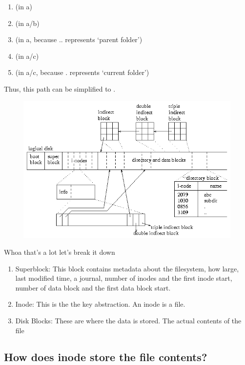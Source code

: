 \begin{enumerate}
  \item {} (in a) 
  \item {} (in a/b)
  \item {} (in a, because .. represents `parent folder')
  \item {} (in a/c)
  \item {} (in a/c, because . represents `current folder')
\end{enumerate}

Thus, this path can be simplified to .

\begin{figure}[htbp]
\centering
\includegraphics[width=.8\textwidth]{filesystems/images/disk.gif}
\caption{}
\end{figure}

Whoa that's a lot let's break it down 

\begin{enumerate}
\item Superblock: This block contains metadata about the filesystem, how large, last modified time, a journal, number of inodes and the first inode start, number of data block and the first data block start. 
\item Inode: This is the the key abstraction. An inode is a file. 
\item Disk Blocks: These are where the data is stored. The actual contents of the file
\end{enumerate}

\subsection{How does inode store the file contents?}\label{how-does-inode-store-the-file-contents}

